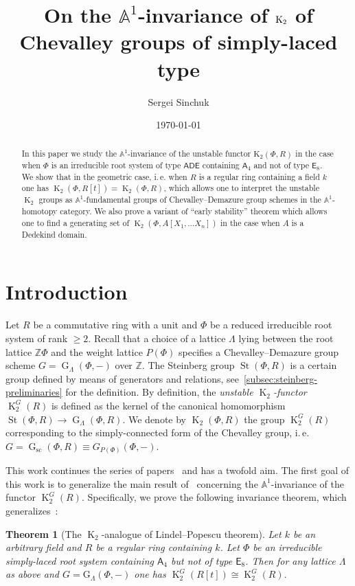 \documentclass[oneside, 10pt]{amsart}
\title{On the $\mathbb{A}^1$-invariance of $\K_2$ of Chevalley groups of simply-laced type}
\author {Sergei Sinchuk}
\date {\today}
\DeclareMathOperator{\St}{St}
\DeclareMathOperator{\G}{G}
\newcommand{\Gsc}{\G_\mathrm{sc}}
\DeclareMathOperator{\K}{K}
\newcommand{\rA}{\mathsf{A}}
\newcommand{\rE}{\mathsf{E}}
\newcommand{\ZZ}{\mathbb{Z}}
\newtheorem{thm}{Theorem}
\numberwithin{equation}{section}
\numberwithin{thm}{section}
\numberwithin{lemma}{section}
\theoremstyle{definition}
\theoremstyle{remark}
\begin{document}
\maketitle

\begin{abstract}
In this paper we study the $\mathbb{A}^1$-invariance of the unstable functor $\mathrm{K}_2(\Phi, R)$
in the case when $\Phi$ is an irreducible root system of type $\mathsf{ADE}$ containing $\rA_4$ and not of type $\rE_8$.
We show that in the geometric case, i.\,e. when $R$ is a regular ring containing a field $k$
one has $\K_2(\Phi, R[t]) = \K_2(\Phi, R)$, which allows one to interpret the unstable $\K_2$ groups
as $\mathbb{A}^1$-fundamental groups of Chevalley--Demazure group schemes in the $\mathbb{A}^1$-homotopy category.
We also prove a variant of ``early stability'' theorem which allows one to find a generating set
of $\K_2(\Phi, A[X_1, \ldots X_n])$ in the case when $A$ is a Dedekind domain.
\end{abstract}

\section{Introduction}\label{sec:introduction}

Let $R$ be a commutative ring with a unit and $\Phi$ be a reduced irreducible root system of rank $\geq 2$.
Recall that a choice of a lattice $\Lambda$ lying between the root lattice $\mathbb{Z}\Phi$ and the weight lattice $P(\Phi)$
specifies a Chevalley--Demazure group scheme $G=\G_\Lambda(\Phi, -)$ over $\ZZ$.
The Steinberg group $\St(\Phi, R)$ is a certain group defined by means of generators and relations, see~\cref{subsec:steinberg-preliminaries} for the definition.
By definition, the \textit{unstable $\K_2$-functor} $\K_2^G(R)$ is defined as the kernel of the canonical homomorphism $\St(\Phi, R) \to \G_\Lambda(\Phi, R)$.
We denote by $\K_2(\Phi, R)$ the group $\K_2^{G}(R)$ corresponding to the simply-connected form of the Chevalley group,
 i.\,e. $G = \Gsc(\Phi, R) \equiv G_{P(\Phi)}(\Phi, -)$.

This work continues the series of papers~\cite{LS20, LSV2} and has a twofold aim.
The first goal of this work is to generalize the main result of~\cite{LSV2} concerning the $\mathbb{A}^1$-invariance of the functor $\K_2^G(R)$.
Specifically, we prove the following invariance theorem, which generalizes~\cite[Theorem~1.1]{LSV2}:

\begin{thm}[The $\K_2$-analogue of Lindel--Popescu theorem] \label{thm:LP-for-K2}
Let $k$ be an arbitrary field and $R$ be a regular ring containing $k$.
Let $\Phi$ be an irreducible simply-laced root system containing $\rA_4$ but not of type $\rE_8$.
Then for any lattice $\Lambda$ as above and $G = \mathrm{G}_\Lambda(\Phi, -)$ one has
$\K_2^G(R[t])\cong\K_2^G(R).$
\end{thm}
\end{document}
